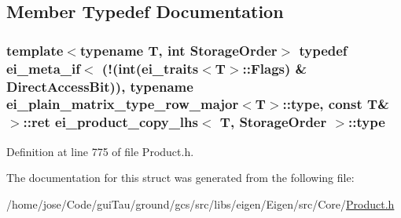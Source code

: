 \subsection{Member Typedef Documentation}
\hypertarget{structei__product__copy__lhs_a0bb896f67d653535ea0fb5a56ce558db}{
\subsubsection[{type}]{\setlength{\rightskip}{0pt plus 5cm}template$<$typename T, int Storage\-Order$>$ typedef {\bf ei\-\_\-meta\-\_\-if}$<$ (!({\bf int}({\bf ei\-\_\-traits}$<$T$>$\-::Flags) \& {\bf Direct\-Access\-Bit})), typename {\bf ei\-\_\-plain\-\_\-matrix\-\_\-type\-\_\-row\-\_\-major}$<$T$>$\-::{\bf type}, const T\& $>$\-::{\bf ret} {\bf ei\-\_\-product\-\_\-copy\-\_\-lhs}$<$ T, Storage\-Order $>$\-::{\bf type}}}\label{structei__product__copy__lhs_a0bb896f67d653535ea0fb5a56ce558db}


Definition at line 775 of file Product.\-h.



The documentation for this struct was generated from the following file\-:\begin{DoxyCompactItemize}
\item 
/home/jose/\-Code/gui\-Tau/ground/gcs/src/libs/eigen/\-Eigen/src/\-Core/\hyperlink{_product_8h}{Product.\-h}\end{DoxyCompactItemize}

